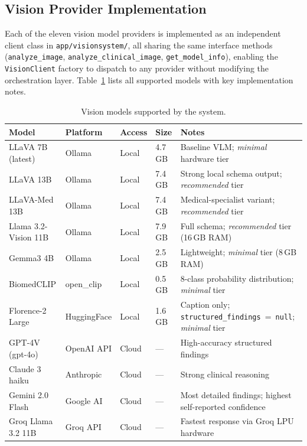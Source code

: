 \documentclass[12pt,a4paper]{report}
\begin{document}
	\subsection{Vision Provider Implementation}
	\label{subsec:vision_impl}
	
	Each of the eleven vision model providers is implemented as an
	independent client class in \texttt{app/visionsystem/}, all sharing the
	same interface methods (\texttt{analyze\_image},
	\texttt{analyze\_clinical\_image}, \texttt{get\_model\_info}), enabling
	the \texttt{VisionClient} factory to dispatch to any provider without
	modifying the orchestration layer.  Table~\ref{tab:vision_models} lists
	all supported models with key implementation notes.
	
	\begin{table}[H]
		\centering
		\caption{Vision models supported by the system.}
		\label{tab:vision_models}
		\small
		\renewcommand{\arraystretch}{1.2}
		\begin{tabularx}{\textwidth}{@{}l l l l X@{}}
			\toprule
			\textbf{Model} & \textbf{Platform} & \textbf{Access} & \textbf{Size} & \textbf{Notes} \\
			\midrule
			LLaVA 7B (latest)    & Ollama      & Local  & 4.7\,GB  & Baseline VLM; \textit{minimal} hardware tier \\
			LLaVA 13B            & Ollama      & Local  & 7.4\,GB  & Strong local schema output; \textit{recommended} tier \\
			LLaVA-Med 13B        & Ollama      & Local  & 7.4\,GB  & Medical-specialist variant; \textit{recommended} tier \\
			Llama 3.2-Vision 11B & Ollama      & Local  & 7.9\,GB  & Full schema; \textit{recommended} tier (16\,GB RAM) \\
			Gemma3 4B            & Ollama      & Local  & 2.5\,GB  & Lightweight; \textit{minimal} tier (8\,GB RAM) \\
			BiomedCLIP           & open\_clip  & Local  & 0.5\,GB  & 8-class probability distribution; \textit{minimal} tier \\
			Florence-2 Large     & HuggingFace & Local  & 1.6\,GB  & Caption only; \texttt{structured\_findings}~=~\texttt{null}; \textit{minimal} tier \\
			GPT-4V (gpt-4o)      & OpenAI API  & Cloud  & ---      & High-accuracy structured findings \\
			Claude 3 haiku    & Anthropic   & Cloud  & ---      & Strong clinical reasoning \\
			Gemini 2.0 Flash     & Google AI   & Cloud  & ---      & Most detailed findings; highest self-reported confidence \\
			Groq Llama 3.2 11B   & Groq API    & Cloud  & ---      & Fastest response via Groq LPU hardware \\
			\bottomrule
		\end{tabularx}
	\end{table}
	
\end{document}
